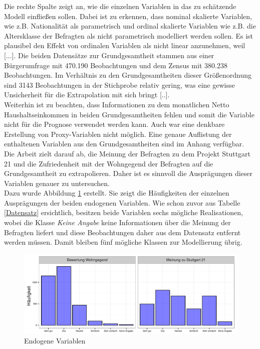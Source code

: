 \documentclass{Vorlage}
\begin{document}
Die rechte Spalte zeigt an, wie die einzelnen Variablen in das zu schätzende Modell einfließen sollen. Dabei ist zu erkennen, dass nominal skalierte Variablen, wie z.B. Nationalität als parametrisch und ordinal skalierte Variablen wie z.B. die Altersklasse der Befragten als nicht parametrisch modelliert werden sollen. Es ist plausibel den Effekt von ordinalen Variablen als nicht linear anzunehmen, weil [...]. Die beiden Datensätze zur Grundgesamtheit stammen aus einer Bürgerumfrage mit 470.190 Beobachtungen und dem Zensus mit 380.238 Beobachtungen. Im Verhältnis zu den Grundgesamtheiten  dieser Größenordnung sind 3143 Beobachtungen in der Stichprobe relativ gering, was eine gewisse Unsicherheit für die Extrapolation mit sich bringt [..].\\
Weiterhin ist zu beachten, dass Informationen zu dem monatlichen Netto Haushaltseinkommen in beiden Grundgesamtheiten fehlen und somit die Variable nicht für die Prognose verwendet werden kann. Auch war eine denkbare Erstellung von Proxy-Variablen nicht möglich. Eine genaue Auflistung der enthaltenen Variablen aus den Grundgesamtheiten sind im Anhang verfügbar. Die Arbeit zielt darauf ab, die Meinung der Befragten zu dem Projekt Stuttgart 21 und die Zufriedenheit mit der Wohngegend der Befragten auf die Grundgesamtheit zu extrapolieren. Daher ist es sinnvoll die Ausprägungen dieser Variablen genauer zu untersuchen.\\
Dazu wurde Abbildung \ref{endogene} erstellt. Sie zeigt die Häufigkeiten der einzelnen Ausprägungen der beiden endogenen Variablen. Wie schon zuvor aus Tabelle \ref{Datensatz} ersichtlich, besitzen beide Variablen sechs mögliche Realisationen, wobei die Klasse \textit{Keine Angabe} keine Informationen über die Meinung der Befragten liefert und diese Beobachtungen daher aus dem Datensatz entfernt werden müssen. Damit bleiben fünf mögliche Klassen zur Modellierung übrig.

\begin{figure}[h]
 \begin{center}
 \includegraphics[scale=0.8]{Pictures/BarResp}
 \caption{Endogene Variablen}
 \label{endogene}
 \end{center}
\end{figure}
\end{document}
